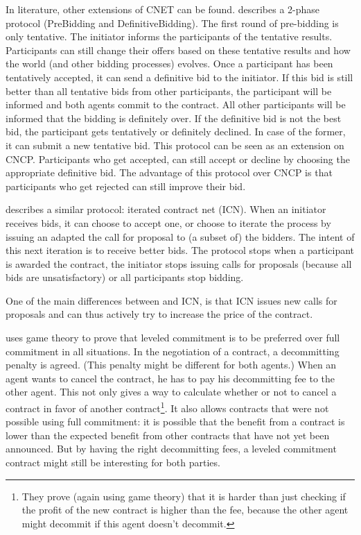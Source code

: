 \documentclass[10pt,a4paper]{article}
\begin{document}
In literature, other extensions of CNET can be found. \cite{TentativeBidding} describes a 2-phase protocol (PreBidding and DefinitiveBidding). The first round of pre-bidding is only tentative. The initiator informs the participants of the tentative results. Participants can still change their offers based on these tentative results and how the world (and other bidding processes) evolves. Once a participant has been tentatively accepted, it can send a definitive bid to the initiator. If this bid is still better than all tentative bids from other participants, the participant will be informed and both agents commit to the contract. All other participants will be informed that the bidding is definitely over. If the definitive bid is not the best bid, the participant gets tentatively or definitely declined. In case of the former, it can submit a new tentative bid. This protocol can be seen as an extension on CNCP. Participants who get accepted, can still accept or decline by choosing the appropriate definitive bid. The advantage of this protocol over CNCP is that participants who get rejected can still improve their bid.

\cite{CNETIterativeStandard} describes a similar protocol: iterated contract net (ICN). When an initiator receives bids, it can choose to accept one, or choose to iterate the process by issuing an adapted the call for proposal to (a subset of) the bidders. The intent of this next iteration is to receive better bids. The protocol stops when a participant is awarded the contract, the initiator stops issuing calls for proposals (because all bids are unsatisfactory) or all participants stop bidding.

One of the main differences between \cite{TentativeBidding} and ICN, is that ICN issues new calls for proposals and can thus actively try to increase the price of the contract.  

\cite{LeveledCommitment} uses game theory to prove that leveled commitment is to be preferred over full commitment in all situations. In the negotiation of a contract, a decommitting penalty is agreed. (This penalty might be different for both agents.) When an agent wants to cancel the contract, he has to pay his decommitting fee to the other agent. This not only gives a way to calculate whether or not to cancel a contract in favor of another contract\footnote{They prove (again using game theory) that it is harder than just checking if the profit of the new contract is higher than the fee, because the other agent might decommit if this agent doesn't decommit.}. It also allows contracts that were not possible using full commitment: it is possible that the benefit from a contract is lower than the expected benefit from other contracts that have not yet been announced. But by having the right decommitting fees, a leveled commitment contract might still be interesting for both parties.
\end{document}
